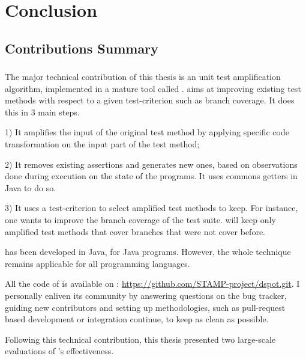 \chapter{Conclusion}
\label{chap:conclusion}

\minitoc

\graphicspath{{.}{chapitres/conclusion/}}

\section{Contributions Summary}
\label{sec:conclusion:contributions-summary}

\subsection{\dspot}
\label{subsec:conclusion:contributions-summary:dspot}

The major technical contribution of this thesis is an unit test amplification algorithm, implemented in a mature tool called \dspot.
\dspot aims at improving existing test methods with respect to a given test-criterion such as branch coverage.
It does this in 3 main steps.

1) It amplifies the input of the original test method by applying specific code transformation on the input part of the test method;

2) It removes existing assertions and generates new ones, based on observations done during execution on the state of the programs.
It uses commons getters in Java to do so.

3) It uses a test-criterion to select amplified test methods to keep.
For instance, one wants to improve the branch coverage of the test suite.
\dspot will keep only amplified test methods that cover branches that were not cover before.

\dspot has been developed in Java, for Java programs.
However, the whole technique remains applicable for all programming languages.

All the code of \dspot is available on \gh: \url{https://github.com/STAMP-project/dspot.git}.
I personally enliven its community by answering questions on the bug tracker, guiding new contributors and setting up methodologies, such as pull-request based development or integration continue, to keep \dspot as clean as possible.

Following this technical contribution, this thesis presented two large-scale evaluations of \dspot's effectiveness.

